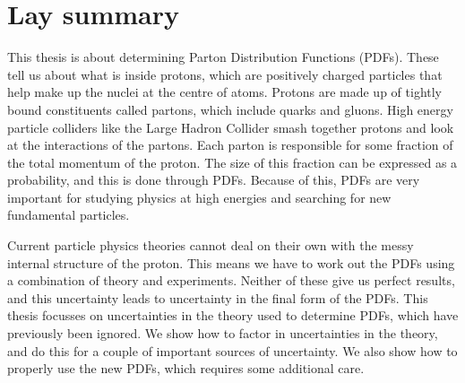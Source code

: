 \chapter{Lay summary}
This thesis is about determining Parton Distribution Functions (PDFs). These tell us about what is inside protons, which are positively charged particles that help make up the nuclei at the centre of atoms. Protons are made up of tightly bound constituents called partons, which include quarks and gluons. High energy particle colliders like the Large Hadron Collider smash together protons and look at the interactions of the partons. Each parton is responsible for some fraction of the total momentum of the proton. The size of this fraction can be expressed as a probability, and this is done through PDFs. Because of this, PDFs are very important for studying physics at high energies and searching for new fundamental particles. 

Current particle physics theories cannot deal on their own with the messy internal structure of the proton. This means we have to work out the PDFs using a combination of theory and experiments. Neither of these give us perfect results, and this uncertainty leads to uncertainty in the final form of the PDFs. This thesis focusses on uncertainties in the theory used to determine PDFs, which have previously been ignored. We show how to factor in uncertainties in the theory, and do this for a couple of important sources of uncertainty. We also show how to properly use the new PDFs, which requires some additional care.
